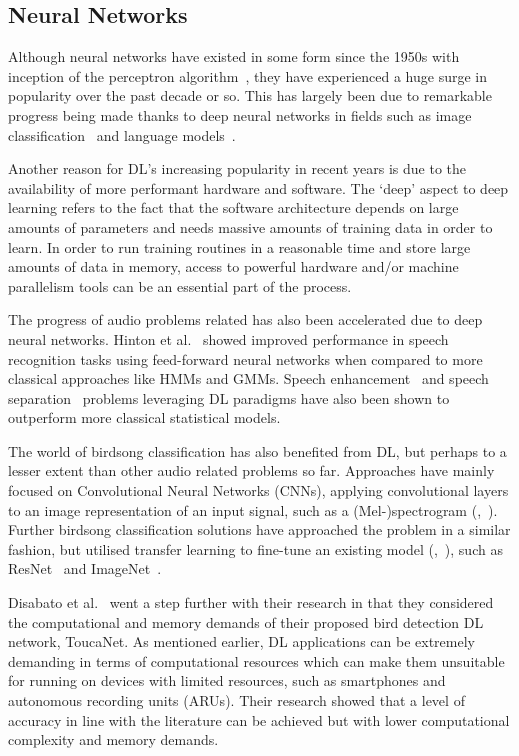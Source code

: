 \subsection{Neural Networks}\label{ssec:nn}

Although neural networks have existed in some form since the 1950s with
inception of the perceptron algorithm~\cite{rosenblatt1958perceptron}, they have
experienced a huge surge in popularity over the past decade or so. This has
largely been due to remarkable progress being made thanks to deep neural
networks in fields such as image classification~\cite{krizhevsky2012imagenet}
and language models~\cite{mikolov2010recurrent}.

Another reason for DL's increasing popularity in recent years is due
to the availability of more performant hardware and software. The `deep' aspect
to deep learning refers to the fact that the software architecture depends on
large amounts of parameters and needs massive amounts of training data in order
to learn. In order to run training routines in a reasonable time and store large
amounts of data in memory, access to powerful hardware and/or machine
parallelism tools can be an essential part of the process.

The progress of audio problems related has also been accelerated due to deep
neural networks. Hinton et al.~\cite{hinton2012deep} showed improved performance
in speech recognition tasks using feed-forward neural networks when compared to
more classical approaches like HMMs and GMMs. Speech
enhancement~\cite{afouras2018conversation} and speech
separation~\cite{ephrat2018looking} problems leveraging DL paradigms
have also been shown to outperform more classical statistical models.

The world of birdsong classification has also benefited from DL, but
perhaps to a lesser extent than other audio related problems so far. Approaches
have mainly focused on Convolutional Neural Networks (CNNs), applying
convolutional layers to an image representation of an input signal, such as a
(Mel-)spectrogram (\cite{berger2018bird},~\cite{mukherjee2018convolutional}).
Further birdsong classification solutions have approached the problem in a
similar fashion, but utilised transfer learning to fine-tune an existing model
(\cite{disabato2021birdsong},~\cite{lasseck2018acoustic}), such as
ResNet~\cite{he2016deep} and ImageNet~\cite{deng2009imagenet}.

Disabato et al.~\cite{disabato2021birdsong} went a step further with their
research in that they considered the computational and memory demands of their
proposed bird detection DL network, ToucaNet. As mentioned earlier, DL
applications can be extremely demanding in terms of computational resources
which can make them unsuitable for running on devices with limited resources,
such as smartphones and autonomous recording units (ARUs). Their research showed
that a level of accuracy in line with the literature can be achieved but with
lower computational complexity and memory demands.


